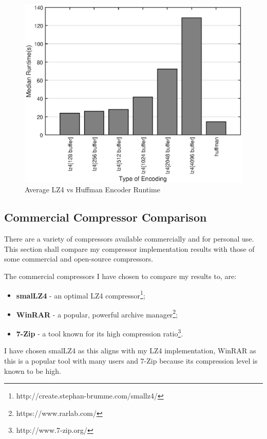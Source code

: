 \documentclass[12pt]{article}
\begin{document}
\begin{figure}[H]
	\centering
	\includegraphics[width=6.0in]{average_runtime}
	\caption{Average LZ4 vs Huffman Encoder Runtime}
	\label{fig:average_runtime}
\end{figure}
\clearpage

\subsection{Commercial Compressor Comparison}
There are a variety of compressors available commercially and for personal use. This section shall compare my compressor implementation results with those of some commercial and open-source compressors.

The commercial compressors I have chosen to compare my results to, are:
\begin{itemize}
	\item \textbf{smalLZ4} - an optimal LZ4 compressor\footnote{http://create.stephan-brumme.com/smallz4/};
	\item \textbf{WinRAR} - a popular, powerful archive manager\footnote{https://www.rarlab.com/};
	\item \textbf{7-Zip} - a tool known for its high compression ratio\footnote{http://www.7-zip.org/}.
\end{itemize}

I have chosen smalLZ4 as this aligns with my LZ4 implementation, WinRAR as this is a popular tool with many users and 7-Zip because its compression level is known to be high.
\end{document}
